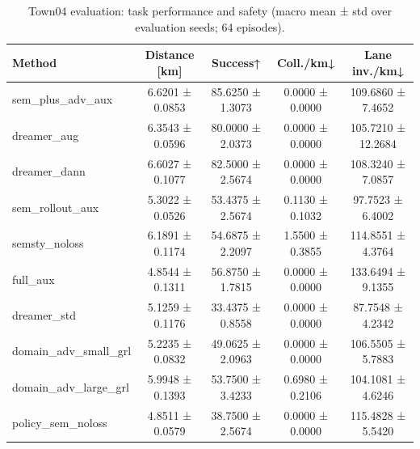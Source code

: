 \begin{table}
\caption{Town04 evaluation: task performance and safety (macro mean ± std over evaluation seeds; 64 episodes).}
\label{tab:town04_task_performance}
\begin{tabular}{lcccc}
\toprule
Method & Distance [km] & Success↑ & Coll./km↓ & Lane inv./km↓ \\
\midrule
sem_plus_adv_aux & 6.6201 ± 0.0853 & 85.6250 ± 1.3073 & 0.0000 ± 0.0000 & 109.6860 ± 7.4652 \\
dreamer_aug & 6.3543 ± 0.0596 & 80.0000 ± 2.0373 & 0.0000 ± 0.0000 & 105.7210 ± 12.2684 \\
dreamer_dann & 6.6027 ± 0.1077 & 82.5000 ± 2.5674 & 0.0000 ± 0.0000 & 108.3240 ± 7.0857 \\
sem_rollout_aux & 5.3022 ± 0.0526 & 53.4375 ± 2.5674 & 0.1130 ± 0.1032 & 97.7523 ± 6.4002 \\
semsty_noloss & 6.1891 ± 0.1174 & 54.6875 ± 2.2097 & 1.5500 ± 0.3855 & 114.8551 ± 4.3764 \\
full_aux & 4.8544 ± 0.1311 & 56.8750 ± 1.7815 & 0.0000 ± 0.0000 & 133.6494 ± 9.1355 \\
dreamer_std & 5.1259 ± 0.1176 & 33.4375 ± 0.8558 & 0.0000 ± 0.0000 & 87.7548 ± 4.2342 \\
domain_adv_small_grl & 5.2235 ± 0.0832 & 49.0625 ± 2.0963 & 0.0000 ± 0.0000 & 106.5505 ± 5.7883 \\
domain_adv_large_grl & 5.9948 ± 0.1393 & 53.7500 ± 3.4233 & 0.6980 ± 0.2106 & 104.1081 ± 4.6246 \\
policy_sem_noloss & 4.8511 ± 0.0579 & 38.7500 ± 2.5674 & 0.0000 ± 0.0000 & 115.4828 ± 5.5420 \\
\bottomrule
\end{tabular}
\end{table}
